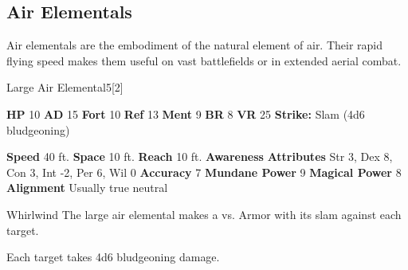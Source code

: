       
    \subsection{Air Elementals}
      
      Air elementals are the embodiment of the natural element of air.
      Their rapid flying speed makes them useful on vast battlefields or in extended aerial combat.
    

      
  \begin{monsubsection}{Large Air Elemental}{5}[2]
    \vspace{-1em}\vspace{-1em}
    \vspace{0em}

    
    

    \begin{spellcontent}
      \begin{spelltargetinginfo}
        \pari \textbf{HP} 10 \monsep
          \textbf{AD} 15 \monsep
          \textbf{Fort} 10 \monsep
          \textbf{Ref} 13 \monsep
          \textbf{Ment} 9
        \pari \textbf{BR} 8 \monsep
        \textbf{VR} 25
        \pari \textbf{Strike:}
            Slam  (4d6 bludgeoning)
      \end{spelltargetinginfo}
    \end{spellcontent}
    \begin{monsterfooter}
      \pari \textbf{Speed} 40 ft. \monsep
        \textbf{Space} 10 ft. \monsep
        \textbf{Reach} 10 ft.
      \pari \textbf{Awareness} 
      \pari \textbf{Attributes}
        Str 3, Dex 8,
        Con 3, Int -2,
        Per 6, Wil 0
      \pari \textbf{Accuracy} 7 \monsep
        \textbf{Mundane Power} 9 \monsep
      \textbf{Magical Power} 8
      \pari \textbf{Alignment} Usually true neutral
    \end{monsterfooter}
  \end{monsubsection}
  \begin{freeability}{Whirlwind}
       The large air elemental makes a 
         vs. Armor
        with its slam against each target.
    
    \hit Each target takes 4d6 bludgeoning damage.
    \end{freeability}
  

